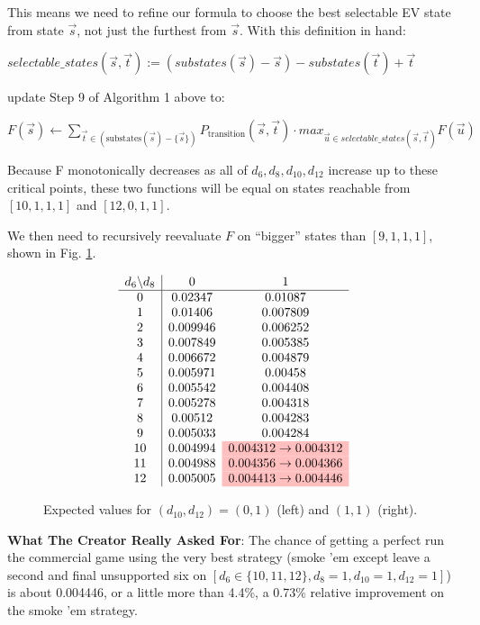 \documentclass[11pt, oneside]{article} 	%
\begin{document}
This means we need to refine our formula to choose the best selectable EV state from state $\vec{s}$, not just the furthest from $\vec{s}$.  With this definition in hand:

$selectable\_states(\vec{s}, \vec{t}) := (substates(\vec{s}) - \vec{s}) - substates(\vec{t}) + \vec{t}$

update Step 9 of Algorithm 1 above to: 

$F(\vec{s}) \gets \sum_{\vec{t} \in \left(\text{substates}(\vec{s}) - \{\vec{s}\}\right)} 
     P_{\text{transition}}(\vec{s},\vec{t}) \cdot max_{\vec{u} \in selectable\_states(\vec{s}, \vec{t})} F(\vec{u})$
     

Because F monotonically decreases as all of $d_6, d_8, d_{10}, d_{12}$ increase up to these critical points, these two functions will be equal on states reachable from $[10,1,1,1]$ and $[12,0,1,1]$.

We then need to recursively reevaluate $F$ on ``bigger'' states than $[9,1,1,1]$, shown in Fig. \ref{fig:ev-tables-corrected}.

\begin{figure}[ht]
    \centering
    \[
  \begin{array}{c|cc}
  d_6 \backslash d_8 & 0 & 1\\\hline
  0&0.02347&0.01087\\
  1&0.01406&0.007809\\
  2&0.009946&0.006252\\
  3&0.007849&0.005385\\
  4&0.006672&0.004879\\
  5&0.005971&0.00458\\
  6&0.005542&0.004408\\
  7&0.005278&0.004318\\
  8&0.00512&0.004283\\
  9&0.005033&0.004284\\
  10&0.004994&\cellcolor{pink}0.004312 \rightarrow 0.004312\\
  11&0.004988&\cellcolor{pink}0.004356 \rightarrow 0.004366\\
  12&0.005005&\cellcolor{pink}0.004413 \rightarrow0.004446\\
  \end{array}
    \]
    \caption{Expected values for $(d_{10},d_{12})=(0,1)$ (left) and $(1,1)$ (right).}
    \label{fig:ev-tables-corrected}
\end{figure}


\begin{framed}
\textbf{What The Creator Really Asked For}: The chance of getting a perfect run the commercial game using the very best strategy (smoke 'em except leave a second and final unsupported six on $[d_6 \in \{10,11,12\},d_8=1,d_{10}=1,d_{12}=1]$) is about 0.004446, or a little more than 4.4\%, a 0.73\% relative improvement on the smoke 'em strategy.
\end{framed}
\end{document}
